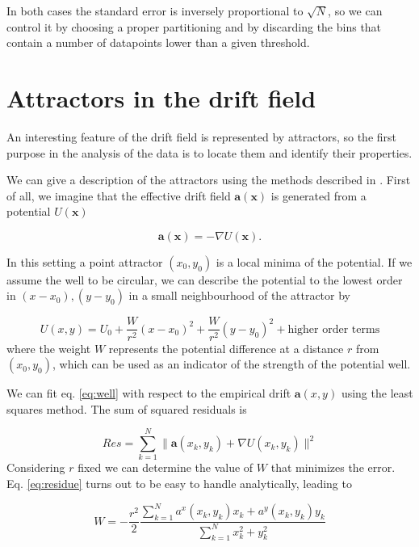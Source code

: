 \documentclass[a4paper]{article}
\begin{document}
In both cases the standard error is inversely proportional to $\sqrt{N}$, so we can control it by choosing a proper partitioning and by discarding the bins that contain a number of datapoints lower than a given threshold.


\section{Attractors in the drift field}

An interesting feature of the drift field is represented by attractors, so the first purpose in the analysis of the data is to locate them and identify their properties.

We can give a description of the attractors using the methods described in \cite{hoze2012}. First of all, we imagine that the effective drift field $\bm{a}(\bm{x})$ is generated from a potential $U(\bm{x})$

\begin{equation}
\bm{a}(\bm{x}) = -\nabla U(\bm{x}).
\end{equation}

In this setting a point attractor $(x_0, y_0)$ is a local minima of the potential. If we assume the well to be circular, we can describe the potential to the lowest order in $(x - x_0), (y - y_0)$ in a small neighbourhood of the attractor by

\begin{equation} \label{eq:well}
U(x, y) = U_0 + \frac{W}{r^2}\left(x - x_0\right)^2 + \frac{W}{r^2}\left(y - y_0\right)^2 + \text{higher order terms}
\end{equation}
where the weight $W$ represents the potential difference at a distance $r$ from $(x_0, y_0)$, which can be used as an indicator of the strength of the potential well.

We can fit eq. \ref{eq:well} with respect to the empirical drift $\bm{a}(x, y)$ using the least squares method. The sum of squared residuals is

\begin{equation} \label{eq:residue}
Res = \sum_{k = 1}^N \| \bm{a}(x_k, y_k) + \nabla U(x_k, y_k) \|^2
\end{equation}
Considering $r$ fixed we can determine the value of $W$ that minimizes the error. Eq. \ref{eq:residue} turns out to be easy to handle analytically, leading to

\begin{equation}
W = - \frac{r^2}{2} \frac{\sum_{k = 1}^N a^x(x_k, y_k) x_k + a^y(x_k, y_k) y_k}{\sum_{k = 1}^N x_k^2 + y_k^2}
\end{equation}
\end{document}

